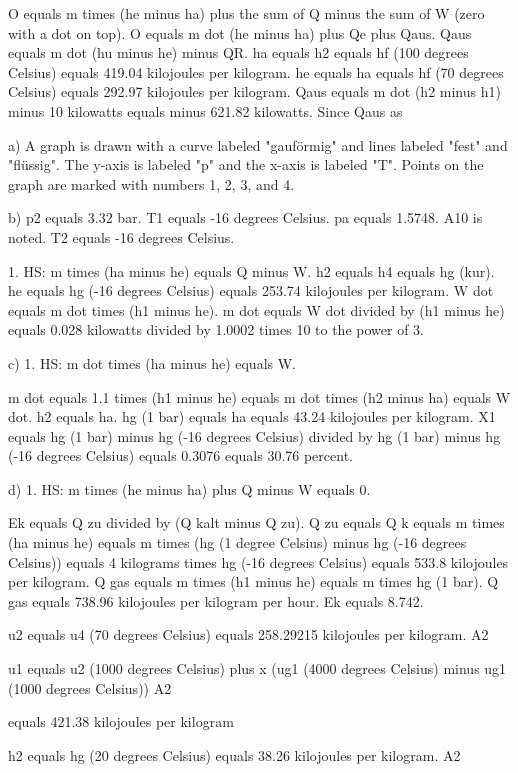 O equals m times (he minus ha) plus the sum of Q minus the sum of W (zero with a dot on top).
O equals m dot (he minus ha) plus Qe plus Qaus.
Qaus equals m dot (hu minus he) minus QR.
ha equals h2 equals hf (100 degrees Celsius) equals 419.04 kilojoules per kilogram.
he equals ha equals hf (70 degrees Celsius) equals 292.97 kilojoules per kilogram.
Qaus equals m dot (h2 minus h1) minus 10 kilowatts equals minus 621.82 kilowatts.
Since Qaus as

a) A graph is drawn with a curve labeled "gauförmig" and lines labeled "fest" and "flüssig". The y-axis is labeled "p" and the x-axis is labeled "T". Points on the graph are marked with numbers 1, 2, 3, and 4.

b) p2 equals 3.32 bar. T1 equals -16 degrees Celsius. pa equals 1.5748. A10 is noted. T2 equals -16 degrees Celsius. 

1. HS: m times (ha minus he) equals Q minus W. 
h2 equals h4 equals hg (kur). 
he equals hg (-16 degrees Celsius) equals 253.74 kilojoules per kilogram. 
W dot equals m dot times (h1 minus he). 
m dot equals W dot divided by (h1 minus he) equals 0.028 kilowatts divided by 1.0002 times 10 to the power of 3.

c) 1. HS: m dot times (ha minus he) equals W.

m dot equals 1.1 times (h1 minus he) equals m dot times (h2 minus ha) equals W dot. 
h2 equals ha. 
hg (1 bar) equals ha equals 43.24 kilojoules per kilogram. 
X1 equals hg (1 bar) minus hg (-16 degrees Celsius) divided by hg (1 bar) minus hg (-16 degrees Celsius) equals 0.3076 equals 30.76 percent.

d) 1. HS: m times (he minus ha) plus Q minus W equals 0.

Ek equals Q zu divided by (Q kalt minus Q zu). 
Q zu equals Q k equals m times (ha minus he) equals m times (hg (1 degree Celsius) minus hg (-16 degrees Celsius)) equals 4 kilograms times hg (-16 degrees Celsius) equals 533.8 kilojoules per kilogram.
Q gas equals m times (h1 minus he) equals m times hg (1 bar). 
Q gas equals 738.96 kilojoules per kilogram per hour. 
Ek equals 8.742.

u2 equals u4 (70 degrees Celsius) equals 258.29215 kilojoules per kilogram. A2

u1 equals u2 (1000 degrees Celsius) plus x (ug1 (4000 degrees Celsius) minus ug1 (1000 degrees Celsius)) A2

equals 421.38 kilojoules per kilogram

h2 equals hg (20 degrees Celsius) equals 38.26 kilojoules per kilogram. A2

